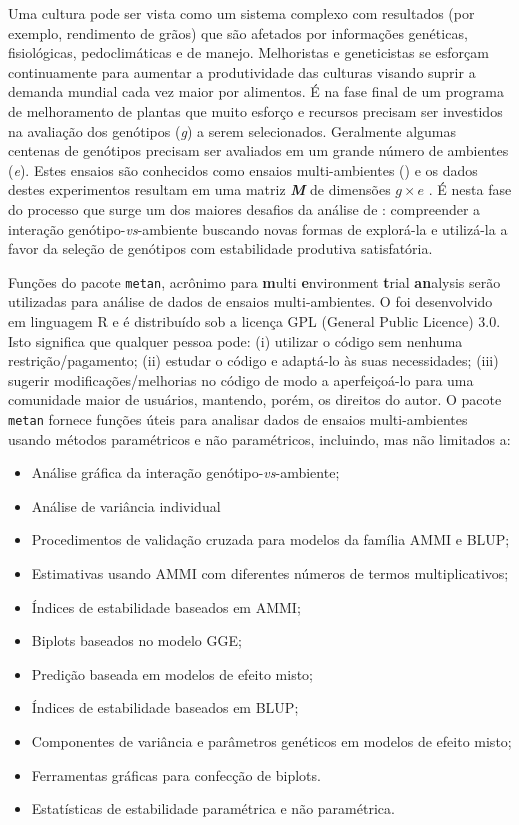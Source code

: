\documentclass[
]{book}
\providecommand{\tightlist}{%
  \setlength{\itemsep}{0pt}\setlength{\parskip}{0pt}}
\begin{document}
Uma cultura pode ser vista como um sistema complexo com resultados (por exemplo, rendimento de grãos) que são afetados por informações genéticas, fisiológicas, pedoclimáticas e de manejo. Melhoristas e geneticistas se esforçam continuamente para aumentar a produtividade das culturas visando suprir a demanda mundial cada vez maior por alimentos. É na fase final de um programa de melhoramento de plantas que muito esforço e recursos precisam ser investidos na avaliação dos genótipos (\emph{\emph{g}}) a serem selecionados. Geralmente algumas centenas de genótipos precisam ser avaliados em um grande número de ambientes (\emph{\emph{e}}). Estes ensaios são conhecidos como ensaios multi-ambientes () e os dados destes experimentos resultam em uma matriz \textbf{\emph{M}} de dimensões \(g \times e\) . É nesta fase do processo que surge um dos maiores desafios da análise de : compreender a interação genótipo-\emph{vs}-ambiente buscando novas formas de explorá-la e utilizá-la a favor da seleção de genótipos com estabilidade  produtiva satisfatória.

Funções do pacote \texttt{metan}, acrônimo para \textbf{m}ulti \textbf{e}nvironment \textbf{t}rial \textbf{an}alysis serão utilizadas para análise de dados de ensaios multi-ambientes. O foi desenvolvido em linguagem R e é distribuído sob a licença GPL (General Public Licence) 3.0. Isto significa que qualquer pessoa pode: (i) utilizar o código sem nenhuma restrição/pagamento; (ii) estudar o código e adaptá-lo às suas necessidades; (iii) sugerir modificações/melhorias no código de modo a aperfeiçoá-lo para uma comunidade maior de usuários, mantendo, porém, os direitos do autor. O pacote \texttt{metan} fornece funções úteis para analisar dados de ensaios multi-ambientes usando métodos paramétricos e não paramétricos, incluindo, mas não limitados a:

\begin{itemize}
\tightlist
\item
  Análise gráfica da interação genótipo-\emph{vs}-ambiente;
\item
  Análise de variância individual
\item
  Procedimentos de validação cruzada para modelos da família AMMI e BLUP;
\item
  Estimativas usando AMMI com diferentes números de termos multiplicativos;
\item
  Índices de estabilidade baseados em AMMI;
\item
  Biplots baseados no modelo GGE;
\item
  Predição baseada em modelos de efeito misto;
\item
  Índices de estabilidade baseados em BLUP;
\item
  Componentes de variância e parâmetros genéticos em modelos de efeito misto;
\item
  Ferramentas gráficas para confecção de biplots.
\item
  Estatísticas de estabilidade paramétrica e não paramétrica.
\end{itemize}
\end{document}
